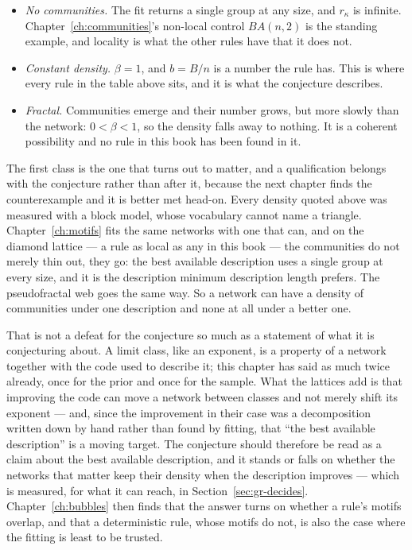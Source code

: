 \begin{itemize}
\item \emph{No communities.} The fit returns a single group at any size, and
  $r_\kappa$ is infinite. Chapter~\ref{ch:communities}'s non-local control
  $BA(n,2)$ is the standing example, and locality is what the other rules have
  that it does not.
\item \emph{Constant density.} $\beta=1$, and $b=B/n$ is a number the rule has.
  This is where every rule in the table above sits, and it is what the conjecture
  describes.
\item \emph{Fractal.} Communities emerge and their number grows, but more slowly
  than the network: $0<\beta<1$, so the density falls away to nothing. It is a
  coherent possibility and no rule in this book has been found in it.
\end{itemize}

\noindent The first class is the one that turns out to matter, and a qualification
belongs with the conjecture rather than after it, because the next chapter finds
the counterexample and it is better met head-on. Every density quoted above was
measured with a block model, whose vocabulary cannot name a triangle.
Chapter~\ref{ch:motifs} fits the same networks with one that can, and on the
diamond lattice --- a rule as local as any in this book --- the communities do not
merely thin out, they go: the best available description uses a single group at
every size, and it is the description minimum description length prefers. The
pseudofractal web goes the same way. So a network can have a density of
communities under one description and none at all under a better one.

That is not a defeat for the conjecture so much as a statement of what it is
conjecturing about. A limit class, like an exponent, is a property of a network
together with the code used to describe it; this chapter has said as much twice
already, once for the prior and once for the sample. What the lattices add is that
improving the code can move a network between classes and not merely shift its
exponent --- and, since the improvement in their case was a decomposition written
down by hand rather than found by fitting, that ``the best available
description'' is a moving target. The conjecture should therefore be read as a claim about the best
available description, and it stands or falls on whether the networks that matter
keep their density when the description improves --- which is measured, for what
it can reach, in Section~\ref{sec:gr-decides}. Chapter~\ref{ch:bubbles} then
finds that the answer turns on whether a rule's motifs overlap, and that a
deterministic rule, whose motifs do not, is also the case where the fitting is
least to be trusted.

